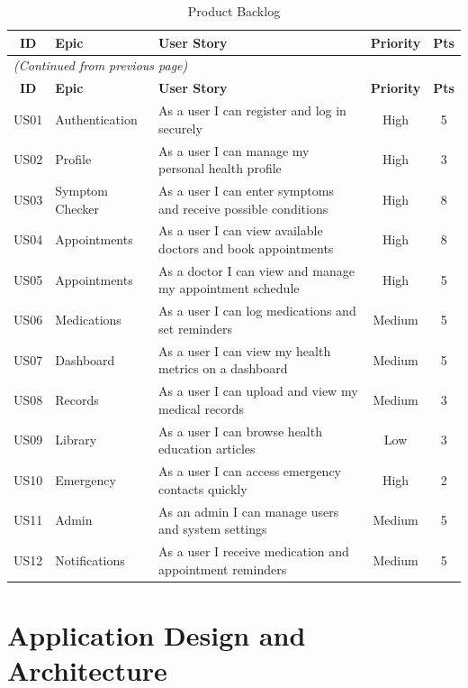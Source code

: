 \documentclass[12pt,a4paper]{report}
\newcommand{\rowO}{\rowcolor{LightGray!60}}
\begin{document}
\begin{longtable}{clp{7cm}cc}
\caption{Product Backlog}\\
\toprule
\rowcolor{PrimaryBlue!15}
\textbf{ID} & \textbf{Epic} & \textbf{User Story} & \textbf{Priority} & \textbf{Pts} \\
\midrule
\endfirsthead
\multicolumn{5}{l}{\footnotesize\textit{(Continued from previous page)}} \\[2pt]
\toprule
\rowcolor{PrimaryBlue!15}
\textbf{ID} & \textbf{Epic} & \textbf{User Story} & \textbf{Priority} & \textbf{Pts} \\
\midrule
\endhead
\midrule
\endfoot
\bottomrule
\endlastfoot
US01 & Authentication & As a user I can register and log in securely & High & 5 \\
\rowO US02 & Profile & As a user I can manage my personal health profile & High & 3 \\
US03 & Symptom Checker & As a user I can enter symptoms and receive possible conditions & High & 8 \\
\rowO US04 & Appointments & As a user I can view available doctors and book appointments & High & 8 \\
US05 & Appointments & As a doctor I can view and manage my appointment schedule & High & 5 \\
\rowO US06 & Medications & As a user I can log medications and set reminders & Medium & 5 \\
US07 & Dashboard & As a user I can view my health metrics on a dashboard & Medium & 5 \\
\rowO US08 & Records & As a user I can upload and view my medical records & Medium & 3 \\
US09 & Library & As a user I can browse health education articles & Low & 3 \\
\rowO US10 & Emergency & As a user I can access emergency contacts quickly & High & 2 \\
US11 & Admin & As an admin I can manage users and system settings & Medium & 5 \\
\rowO US12 & Notifications & As a user I receive medication and appointment reminders & Medium & 5 \\
\end{longtable}


\chapter{Application Design and Architecture}
\end{document}
